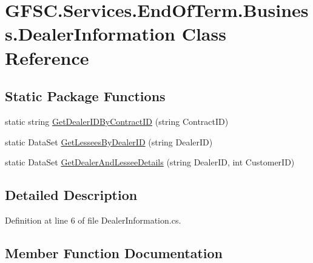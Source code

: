 \hypertarget{class_g_f_s_c_1_1_services_1_1_end_of_term_1_1_business_1_1_dealer_information}{}\section{G\+F\+S\+C.\+Services.\+End\+Of\+Term.\+Business.\+Dealer\+Information Class Reference}
\label{class_g_f_s_c_1_1_services_1_1_end_of_term_1_1_business_1_1_dealer_information}
\subsection*{Static Package Functions}
\begin{DoxyCompactItemize}
\item 
static string \mbox{\hyperlink{class_g_f_s_c_1_1_services_1_1_end_of_term_1_1_business_1_1_dealer_information_a79adda4268cdbe5633d98c1413864173}{Get\+Dealer\+I\+D\+By\+Contract\+ID}} (string Contract\+ID)
\item 
static Data\+Set \mbox{\hyperlink{class_g_f_s_c_1_1_services_1_1_end_of_term_1_1_business_1_1_dealer_information_a8859187eafd6a398278cfa4eebac2052}{Get\+Lessees\+By\+Dealer\+ID}} (string Dealer\+ID)
\item 
static Data\+Set \mbox{\hyperlink{class_g_f_s_c_1_1_services_1_1_end_of_term_1_1_business_1_1_dealer_information_ab0b2211c2d3183c7d86c7f92736b1d3c}{Get\+Dealer\+And\+Lessee\+Details}} (string Dealer\+ID, int Customer\+ID)
\end{DoxyCompactItemize}


\subsection{Detailed Description}


Definition at line 6 of file Dealer\+Information.\+cs.



\subsection{Member Function Documentation}
\mbox{\label{class_g_f_s_c_1_1_services_1_1_end_of_term_1_1_business_1_1_dealer_information_ab0b2211c2d3183c7d86c7f92736b1d3c}} 
